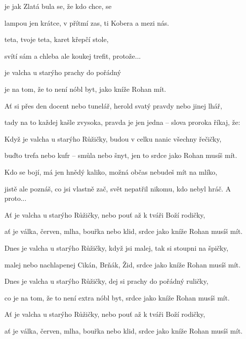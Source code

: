 

\zs
{} je jak Zlatá bula 
 se, že kdo chce, se 

 lampou jen krátce, v přítmí  zas,
 ti Kobera a  mezi nás.
 {}       
\ks

\zs
{} teta, tvoje teta, 
 karet křepčí  stole,

 svítí sám a chleba 
 ale koukej trefit,  protože...
\ks

\zr
{} je valcha u starýho 
 prachy do pořádný 

 je na tom, že to není  nóbl byt,
 jako kníže Rohan  mít.

   
\kr

\zs
Ať si přes den docent nebo tunelář,
herold svatý pravdy nebo jinej lhář,

tady na to každej kašle zvysoka,
pravda je jen jedna -- slova proroka říkaj, že:
\ks

\zr
Když je valcha u starýho Růžičky,
budou v celku nanic všechny řečičky,

buďto trefa nebo kufr -- smůla nebo šnyt,
jen to srdce jako Rohan musíš mít.
\kr

\zs
Kdo se bojí, má jen hnědý kaliko,
možná občas nebudeš mít na mlíko,

jistě ale poznáš, co jsi vlastně zač,
svět nepatřil nikomu, kdo nebyl hráč.
A proto...
\ks

\zr
Ať je valcha u starýho Růžičky,
nebo pouť až k tváři Boží rodičky,

ať je válka, červen, mlha, bouřka nebo klid,
srdce jako kníže Rohan musíš mít.
\kr

\zr
Dnes je valcha u starýho Růžičky,
když jsi malej, tak si stoupni na špičky,

malej nebo nachlapenej Cikán, Brňák, Žid,
srdce jako kníže Rohan musíš mít.
\kr

\zr
Dnes je valcha u starýho Růžičky,
dej si prachy do pořádný ruličky,

co je na tom, že to není extra nóbl byt,
srdce jako kníže Rohan musíš mít.
\kr

\zr
Ať je valcha u starýho Růžičky,
nebo pouť až k tváři Boží rodičky,

ať je válka, červen, mlha, bouřka nebo klid,
srdce jako kníže Rohan musíš mít.
\kr

\kp





